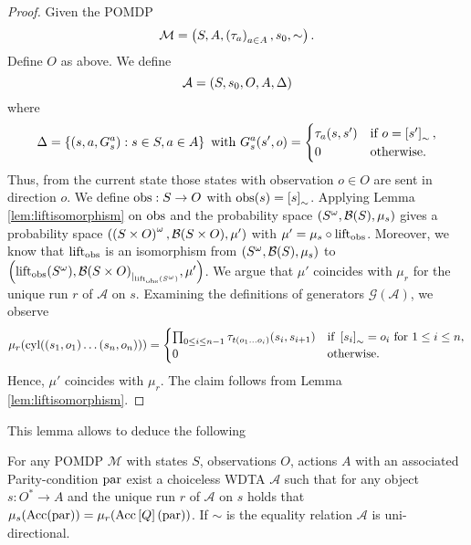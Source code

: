 \begin{proof}
  Given the \ac{POMDP}
  \begin{equation*}
    \mathcal{M} = \left(S, A, \left(\tau_{a}\right)_{a\in A}, s_{0}, \sim\right).
  \end{equation*}
  Define $O$ as above. We define
  \begin{equation*}
    \mathcal{A} = \left(S, s_{0}, O, A, \Delta\right)
  \end{equation*}
  where
  \begin{equation*}
    \Delta = \left\{\left(s, a, G_{s}^{a}\right):s\in S,a\in A\right\}\text{ with }
    G_{s}^{a}(s', o) = \begin{cases}
      \tau_{a}(s, s')&\text{if }o = \left[s'\right]_{\sim},\\
      0              &\text{otherwise.}
    \end{cases}
  \end{equation*}
  Thus, from the current state those states with observation $o\in O$ are sent
  in direction $o$. We define $\operatorname{obs}:S\rightarrow O$ with
  $\operatorname{obs}(s) = \left[s\right]_{\sim}$. Applying Lemma \ref{lem:liftisomorphism}
  on $\operatorname{obs}$ and the probability space $\left(S^{\omega}, \mathcal{B}(S),
  \mu_{s}\right)$ gives a probability space $\left(\left(S\times O\right)^{\omega},
  \mathcal{B}(S\times O), \mu'\right)$ with $\mu' = \mu_{s}\circ\operatorname{lift}_{\operatorname{obs}}$.
  Moreover, we know that $\operatorname{lift}_{\operatorname{obs}}$ is an isomorphism from
  $\left(S^{\omega}, \mathcal{B}(S), \mu_{s}\right)$ to
  $\left(\operatorname{lift}_{\operatorname{obs}}(S^{\omega}),
    {\mathcal{B}(S\times O)}_{|_{\operatorname{lift}_{\operatorname{obs}}(S^{\omega})}}, \mu'\right)$.
  We argue that $\mu'$ coincides with $\mu_{r}$ for the unique run $r$ of
  $\mathcal{A}$ on $s$. Examining the definitions of generators
  $\mathcal{G}(\mathcal{A})$, we observe
  \begin{equation}
    \mu_{r}(\operatorname{cyl}(\left(s_{1},o_{1}\right)\dots\left(s_{n},o_{n}\right))) =
    \begin{cases}
      \prod_{0\leq i\leq n-1}\tau_{t(o_{1}\dots o_{i})}(s_{i}, s_{i+1})
        &\text{if }\left[s_{i}\right]_{\sim} = o_{i}\text{ for }1\leq i\leq n,\\
      0 &\text{otherwise}.
    \end{cases}
    \label{eq:wdtapomdp}
  \end{equation}
  Hence, $\mu'$ coincides with $\mu_{r}$. The claim follows from Lemma
  \ref{lem:liftisomorphism}.
\end{proof}
This lemma allows to deduce the following
\begin{theorem}
  For any \ac{POMDP} $\mathcal{M}$ with states $S$, observations $O$, actions
  $A$ with an associated Parity-condition $\operatorname{par}$ exist a choiceless
  \ac{WDTA} $\mathcal{A}$ such that for any object $s:O^{*}\rightarrow A$ and
  the unique run $r$ of $\mathcal{A}$ on $s$ holds that
  $\mu_{s}(\operatorname{Acc}(\operatorname{par})) = \mu_{r}(\operatorname{Acc}\left[Q\right](\operatorname{par}))$. If $\sim$ is
  the equality relation $\mathcal{A}$ is uni-directional.
  \label{thm:POMDPequivWDTA}
\end{theorem}
